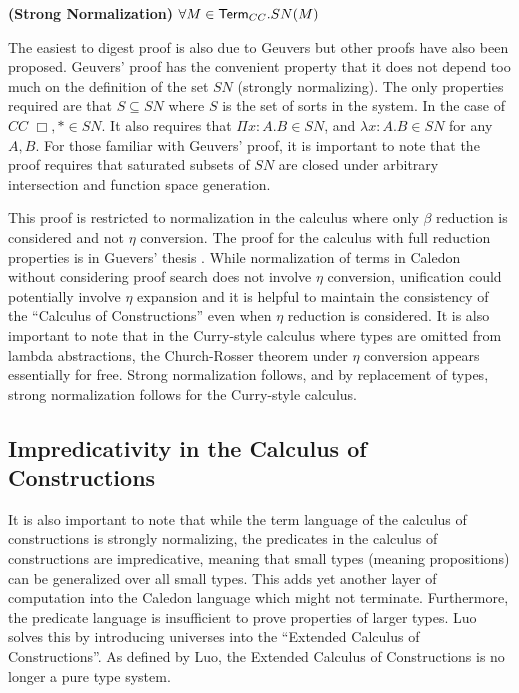 \begin{theorem}
\textbf{(Strong Normalization)} $\forall M \in \mathsf{Term}_{CC}. SN(M)$
\label{cc:cons}
\end{theorem}

The easiest to digest proof is also due to Geuvers \citep{Geuvers94ashort} 
but other proofs have also been proposed.  Geuvers' proof has the convenient
property that it does not depend too much on the definition of the set $SN$ 
(strongly normalizing). The only properties required are that $S \subseteq SN$ 
where $S$ is the set of sorts in the system. In the case of $CC$ $\Box,* \in SN$.
It also requires that $\Pi x : A . B \in SN$, and $\lambda x : A . B \in SN$ 
for any $A,B$.  For those familiar with Geuvers' proof, 
it is important to note that the proof requires that saturated subsets of $SN$ are closed under
arbitrary intersection and function space generation.

This proof is restricted to normalization in the calculus where only $\beta$ reduction 
is considered and not $\eta$ conversion.  The proof for the calculus with full reduction properties is
in Guevers' thesis \citep{geuvers1993logics}.  While normalization of terms in Caledon without considering proof search does
not involve $\eta$ conversion, unification could potentially involve $\eta$ expansion and it is helpful to maintain
the consistency of the ``Calculus of Constructions'' even when $\eta$ reduction is considered.  
It is also important to note that in the Curry-style calculus where types are omitted from lambda abstractions, 
the Church-Rosser theorem under $\eta$ conversion appears essentially for free\citep{miquel2001implicit}. Strong normalization 
follows, and by replacement of types, strong normalization follows for the Curry-style calculus.

\subsection{Impredicativity in the Calculus of Constructions}

It is also important to note that while the term language of the calculus of constructions is strongly normalizing, 
the predicates in the calculus of constructions are impredicative, meaning that small types (meaning propositions) can be generalized over all small types.
This adds yet another layer of computation into the Caledon language which might not terminate.  
Furthermore, the predicate language is insufficient to prove properties of larger types. 
Luo \citep{luo1989ecc} solves this by introducing universes into the ``Extended Calculus of Constructions''.  
As defined by Luo, the Extended Calculus of Constructions is no longer a pure type system.

